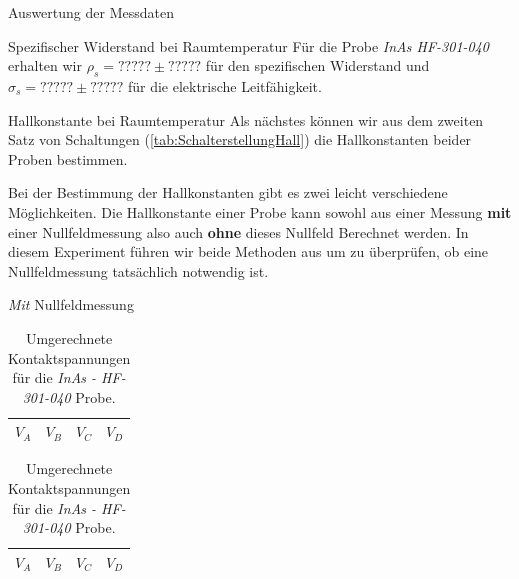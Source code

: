 \documentclass[pdftex, a4paper,11pt, twoside, ngerman]{report}
\begin{document}
\begin{chapter}{Auswertung der Messdaten}
\begin{section}{Spezifischer Widerstand bei Raumtemperatur}
      Für die Probe \textit{InAs HF-301-040} erhalten wir
      $\rho_{s} = ????? \pm ?????$ für den spezifischen Widerstand und
      $\sigma_{s} = ????? \pm ?????$ für die elektrische Leitfähigkeit.
      
      
    \end{section}
   
   
   
    \begin{section}{Hallkonstante bei Raumtemperatur}
      \label{chp:AuswertungHallkonstanteRaumtemperatur}
      Als nächstes können wir aus dem zweiten Satz von Schaltungen
      (\cref{tab:SchalterstellungHall}) die Hallkonstanten beider Proben
      bestimmen.
      
      Bei der Bestimmung der Hallkonstanten gibt es zwei leicht verschiedene
      Möglichkeiten.
      Die Hallkonstante einer Probe kann sowohl aus einer Messung \textbf{mit}
      einer Nullfeldmessung also auch \textbf{ohne} dieses Nullfeld Berechnet
      werden.
      In diesem Experiment führen wir beide Methoden aus um zu überprüfen, ob
      eine Nullfeldmessung tatsächlich notwendig ist.
      
      \begin{subsection}{\textit{Mit} Nullfeldmessung}
        \label{chp:AuswertungHallkonstanteRaumtemperaturMit}
        
        
        \begin{table}[htbp]
          \begin{minipage}{.48\textwidth}
            \centering
            \footnotesize
            \begin{tabular}{cccc}
              $V_{A}$ & $V_{B}$ & $V_{C}$ & $V_{D}$ \\ \hline \hline
              
            \end{tabular}
            \caption{Umgerechnete Kontaktspannungen für die
                \textit{GaAs (alt)} Probe.}
            \label{tab:HallKontaktspannungGaAs}
          \end{minipage}\quad
          \begin{minipage}{.48\textwidth}
            \centering
            \footnotesize
            \begin{tabular}{cccc}
              $V_{A}$ & $V_{B}$ & $V_{C}$ & $V_{D}$ \\ \hline \hline
              
            \end{tabular}
            \caption{Umgerechnete Kontaktspannungen für die 
                \textit{InAs - HF-301-040} Probe.}
            \label{tab:HallKontaktspannungInAs}
          \end{minipage}
        \end{table}
        

\end{subsection}
\end{section}
\end{chapter}
\end{document}

